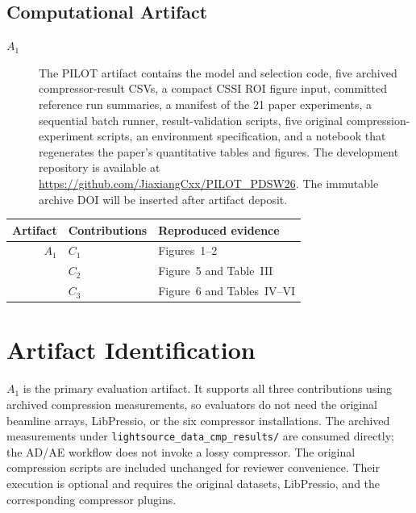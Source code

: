 \subsection{Computational Artifact}
\begin{description}
\item[$A_1$] The \textsc{PILOT} artifact contains the model and selection code, five
archived compressor-result CSVs, a compact CSSI ROI figure input, committed
reference run summaries, a manifest
of the 21 paper experiments, a sequential batch runner, result-validation
scripts, five original compression-experiment scripts, an environment
specification, and a notebook that regenerates the
paper's quantitative tables and figures. The development repository is
available at \url{https://github.com/JiaxiangCxx/PILOT_PDSW26}. The immutable
archive DOI will be inserted after artifact deposit.
\end{description}

\begin{center}
\begin{tabular}{rll}
\toprule
Artifact & Contributions & Reproduced evidence \\
\midrule
$A_1$ & $C_1$ & Figures~1--2 \\
      & $C_2$ & Figure~5 and Table~III \\
      & $C_3$ & Figure~6 and Tables~IV--VI \\
\bottomrule
\end{tabular}
\end{center}

\section{Artifact Identification}

\newartifact
\artrel
$A_1$ is the primary evaluation artifact. It supports all three contributions
using archived compression measurements, so evaluators do not need the
original beamline arrays, LibPressio, or the six compressor installations.
The archived measurements under
\texttt{lightsource\_data\_cmp\_results/} are consumed directly; the AD/AE
workflow does not invoke a lossy compressor.
The original compression scripts are included unchanged for reviewer
convenience. Their execution is optional and requires the original datasets,
LibPressio, and the corresponding compressor plugins.

